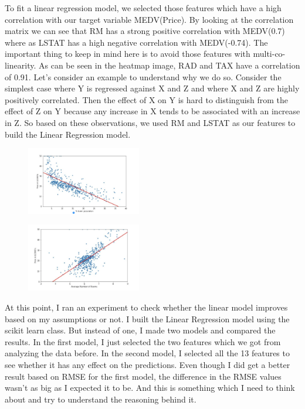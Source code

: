 \documentclass[conference]{IEEEtran}
\begin{document}
To fit a linear regression model, we selected those features which have a high correlation with our target variable MEDV(Price). By looking at the correlation matrix we can see that RM has a strong positive correlation with MEDV(0.7) where as LSTAT has a high negative correlation with MEDV(-0.74). The important thing to keep in mind here is to avoid those features with multi-co-linearity. As can be seen in the heatmap image, RAD and TAX have a correlation of 0.91. Let’s consider an example to understand why we do so. Consider the simplest case where Y is regressed against X and Z and where X and Z are highly positively correlated. Then the effect of X on Y is hard to distinguish from the effect of Z on Y because any increase in X tends to be associated with an increase in Z. So based on these observations, we used RM and LSTAT as our features to build the Linear Regression model. 

\begin{figure}[htbp]
\centerline{\includegraphics[width=50mm,scale=0.5]{imgs/img1}}
\label{fig}
\end{figure}

\begin{figure}[htbp]
\centerline{\includegraphics[width=50mm,scale=0.5]{imgs/img2}}
\label{fig}
\end{figure}

At this point, I ran an experiment to check whether the linear model improves based on my assumptions or not. I built the Linear Regression model using the scikit learn class. But instead of one, I made two models and compared the results. In the first model, I just selected the two features which we got from analyzing the data before. In the second model, I selected all the 13 features to see whether it has any effect on the predictions. Even though I did get a better result based on RMSE for the first model, the difference in the RMSE values wasn’t as big as I expected it to be. And this is something which I need to think about and try to understand the reasoning behind it.
\end{document}
